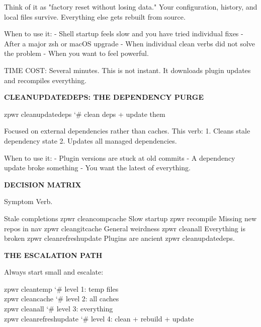 \documentclass[11pt,a4paper,twoside]{book}
\begin{document}
Think of it as "factory reset without losing data." Your configuration, history, and local files survive. Everything else gets rebuilt from source.

When to use it: - Shell startup feels slow and you have tried individual fixes - After a major zsh or macOS upgrade - When individual clean verbs did not solve the problem - When you want to feel powerful.

TIME COST: Several minutes. This is not instant. It downloads plugin updates and recompiles everything.


\vspace{12pt}
{\bfseries\color{neonyellow} CLEANUPDATEDEPS: THE DEPENDENCY PURGE}\vspace{4pt}

\begin{codebox}
\color{neongreen}zpwr cleanupdatedeps                {\char`\#} clean deps + update them\\
\end{codebox}

Focused on external dependencies rather than caches. This verb: 1. Cleans stale dependency state 2. Updates all managed dependencies.

When to use it: - Plugin versions are stuck at old commits - A dependency update broke something - You want the latest of everything.


\vspace{12pt}
{\bfseries\color{neonyellow} DECISION MATRIX}\vspace{4pt}

Symptom                          Verb.

Stale completions                zpwr cleancompcache Slow startup                     zpwr recompile Missing new repos in nav         zpwr cleangitcache General weirdness                zpwr cleanall Everything is broken              zpwr cleanrefreshupdate Plugins are ancient               zpwr cleanupdatedeps.


\vspace{12pt}
{\bfseries\color{neonyellow} THE ESCALATION \textbf{PATH}}\vspace{4pt}

Always start small and escalate:

\begin{codebox}
\color{neongreen}zpwr cleantemp                      {\char`\#} level 1: temp files\\
\color{neongreen}zpwr cleancache                     {\char`\#} level 2: all caches\\
\color{neongreen}zpwr cleanall                       {\char`\#} level 3: everything\\
\color{neongreen}zpwr cleanrefreshupdate             {\char`\#} level 4: clean + rebuild + update\\
\end{codebox}
\end{document}
